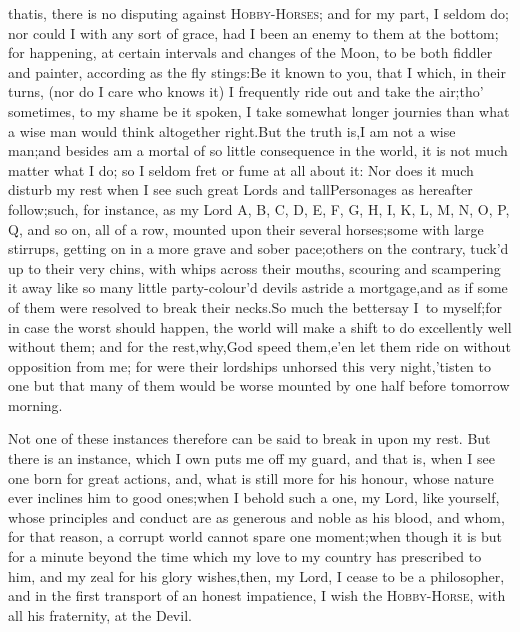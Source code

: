 \documentclass{article}
\begin{document}
\enspace\tsk {}\tsk  that\break is, there is no disputing against
\textsc{Hobby-Horses}; and for my part, I
seldom do; nor could I with any sort of grace, had I been an enemy
to them at the bottom; for happening, at certain intervals and
changes of the Moon, to be both fiddler and painter, according as
the fly stings:\tsk  Be it known to you, that I
which, in their turns, (nor do I care who knows
it) I frequently ride out and take 
the air;\tsk  tho’ sometimes, to my shame\break
be it spoken, I take somewhat longer\break
journies than what a wise man would\break
think altogether right.\tsk  But the truth\break
is,\tsk  I am not a wise man;\tsk  and besides am a mortal of so little consequence in the world,
it is not much matter what I do; so I seldom fret or fume at all
about it: Nor does it much disturb my rest when I see such great
Lords and tall\break Personages as hereafter follow;\tsk  such, for
instance, as my Lord A, B, C, D, E, F, G, H, I, K, L, M, N, O, P,
Q, and so on, all of a row, mounted upon their several
horses;\tsk  some with large stirrups, getting on in a more grave
and sober pace;\tsh  others on the contrary, tuck’d up to
their very chins, with whips across their mouths, scouring and
scampering it away like so many little party-colour’d devils
astride a mortgage,\tsh  and as if\break
some of them were resolved to break\break
their necks.\tsh  So much the better\tsk  say\break
I~to myself;\tsk  for in case the worst should happen, the world will
make a shift to do excellently well without them; and for the
rest,\tsh  why,\tsh  God speed
them,\tsk  e’en let them ride on without opposition
from me; for were their lordships unhorsed this very
night,\tsk  ’tis\break ten to one but that many of them would
be worse mounted by one half before tomorrow
morning.

Not one of these instances therefore can be said to break in upon my rest.\tsk\break
But there is an instance, which I own puts me off my guard, and that is, when I see
one born for great actions, and, what is still more for his honour,
whose nature ever inclines him to good ones;\tsh\break  when I behold such a one, my
Lord, like yourself, whose principles and conduct are as generous and noble as his
blood, and whom, for that reason, a corrupt world cannot spare one moment;\tsk  when
 though it is but for a minute beyond the
time which my love to my country has prescribed to him, and my zeal for his glory
wishes,\tsk  then, my Lord, I cease to be a philosopher, and in the first transport
of an honest impatience, I wish the \textsc{Hobby-Horse}, with all his fraternity,
at the Devil.
\end{document}
